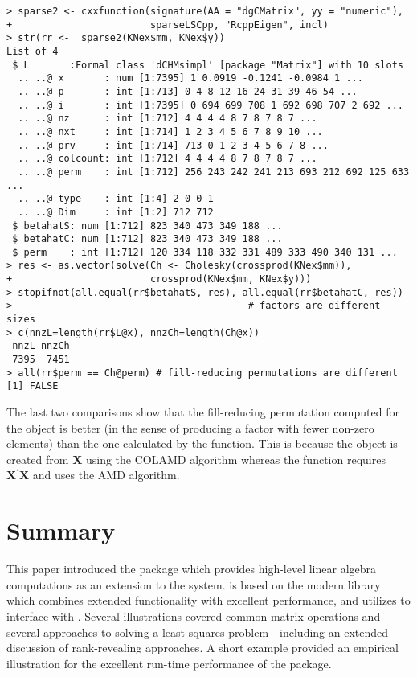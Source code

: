 \documentclass[shortnames,article]{jss}
\begin{document}
\begin{verbatim}
> sparse2 <- cxxfunction(signature(AA = "dgCMatrix", yy = "numeric"),
+                        sparseLSCpp, "RcppEigen", incl)
> str(rr <-  sparse2(KNex$mm, KNex$y))
List of 4
 $ L       :Formal class 'dCHMsimpl' [package "Matrix"] with 10 slots
  .. ..@ x       : num [1:7395] 1 0.0919 -0.1241 -0.0984 1 ...
  .. ..@ p       : int [1:713] 0 4 8 12 16 24 31 39 46 54 ...
  .. ..@ i       : int [1:7395] 0 694 699 708 1 692 698 707 2 692 ...
  .. ..@ nz      : int [1:712] 4 4 4 4 8 7 8 7 8 7 ...
  .. ..@ nxt     : int [1:714] 1 2 3 4 5 6 7 8 9 10 ...
  .. ..@ prv     : int [1:714] 713 0 1 2 3 4 5 6 7 8 ...
  .. ..@ colcount: int [1:712] 4 4 4 4 8 7 8 7 8 7 ...
  .. ..@ perm    : int [1:712] 256 243 242 241 213 693 212 692 125 633 ...
  .. ..@ type    : int [1:4] 2 0 0 1
  .. ..@ Dim     : int [1:2] 712 712
 $ betahatS: num [1:712] 823 340 473 349 188 ...
 $ betahatC: num [1:712] 823 340 473 349 188 ...
 $ perm    : int [1:712] 120 334 118 332 331 489 333 490 340 131 ...
> res <- as.vector(solve(Ch <- Cholesky(crossprod(KNex$mm)),
+                        crossprod(KNex$mm, KNex$y)))
> stopifnot(all.equal(rr$betahatS, res), all.equal(rr$betahatC, res))
>                                         # factors are different sizes
> c(nnzL=length(rr$L@x), nnzCh=length(Ch@x)) 
 nnzL nnzCh 
 7395  7451 
> all(rr$perm == Ch@perm) # fill-reducing permutations are different
[1] FALSE
\end{verbatim}

The last two comparisons show that the fill-reducing permutation
computed for the  object is better (in the sense of
producing a factor with fewer non-zero elements) than the one
calculated by the  function.  This is because
the  object is created from
$\bm X$ using the COLAMD algorithm whereas the 
function requires $\bm X^\prime\bm X$ and uses the AMD algorithm.


\section{Summary}

This paper introduced the  package which provides high-level
linear algebra computations as an extension to the  system.
 is based on the modern  library 
which combines extended functionality with excellent performance, and
utilizes  to interface  with .
Several illustrations covered common matrix operations and
several approaches to solving a least squares problem---including an extended
discussion of rank-revealing approaches.  A short example provided
an empirical illustration  for the excellent run-time performance of the
 package.


\end{document}
